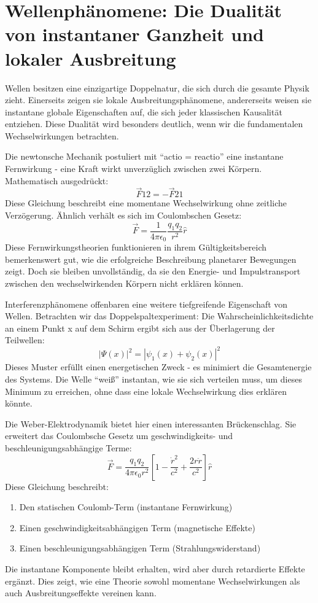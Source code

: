 \section{Wellenphänomene: Die Dualität von instantaner Ganzheit und lokaler Ausbreitung}
Wellen besitzen eine einzigartige Doppelnatur, die sich durch die gesamte Physik zieht. Einerseits zeigen sie lokale Ausbreitungsphänomene, andererseits weisen sie instantane globale
Eigenschaften auf, die sich jeder klassischen Kausalität entziehen. Diese Dualität wird besonders deutlich, wenn wir die fundamentalen Wechselwirkungen betrachten.

Die newtonsche Mechanik postuliert mit \enquote{actio = reactio} eine instantane Fernwirkung - eine Kraft wirkt unverzüglich zwischen zwei Körpern. Mathematisch ausgedrückt:
\[
    \vec{F}{12} = -\vec{F}{21}
\]
Diese Gleichung beschreibt eine momentane Wechselwirkung ohne zeitliche Verzögerung. Ähnlich verhält es sich im Coulombschen Gesetz:
\[
    \vec{F} = \frac{1}{4\pi\epsilon_0}\frac{q_1q_2}{r^2}\hat{r}
\]
Diese Fernwirkungstheorien funktionieren in ihrem Gültigkeitsbereich bemerkenswert gut, wie die erfolgreiche Beschreibung planetarer Bewegungen zeigt. Doch sie bleiben unvollständig,
da sie den Energie- und Impulstransport zwischen den wechselwirkenden Körpern nicht erklären können.

Interferenzphänomene offenbaren eine weitere tiefgreifende Eigenschaft von Wellen. Betrachten wir das Doppelspaltexperiment: Die Wahrscheinlichkeitsdichte an einem Punkt x auf dem
Schirm ergibt sich aus der Überlagerung der Teilwellen:
\[
    |\Psi(x)|^2 = |\psi_1(x) + \psi_2(x)|^2
\]
Dieses Muster erfüllt einen energetischen Zweck - es minimiert die Gesamtenergie des Systems. Die Welle \enquote{weiß} instantan, wie sie sich verteilen muss, um dieses Minimum zu erreichen,
ohne dass eine lokale Wechselwirkung dies erklären könnte.

Die Weber-Elektrodynamik bietet hier einen interessanten Brückenschlag. Sie erweitert das Coulombsche Gesetz um geschwindigkeits- und beschleunigungsabhängige Terme:
\begin{equation}
    \label{eq:weber_em}
    \vec{F} = \frac{q_1q_2}{4\pi\epsilon_0r^2}\left[1 - \frac{\dot{r}^2}{c^2} + \frac{2r\ddot{r}}{c^2}\right]\hat{r}
\end{equation}
Diese Gleichung beschreibt:
\begin{enumerate}
    \item Den statischen Coulomb-Term (instantane Fernwirkung)
    \item Einen geschwindigkeitsabhängigen Term (magnetische Effekte)
    \item Einen beschleunigungsabhängigen Term (Strahlungswiderstand)
\end{enumerate}
Die instantane Komponente bleibt erhalten, wird aber durch retardierte Effekte ergänzt. Dies zeigt, wie eine Theorie sowohl momentane Wechselwirkungen als auch Ausbreitungseffekte vereinen kann.

